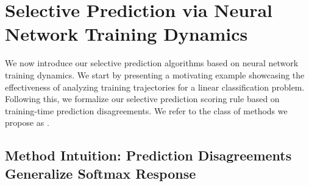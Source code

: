 

\section{Selective Prediction via Neural Network Training Dynamics}
\label{sec:method}



We now introduce our selective prediction algorithms based on neural network training dynamics. We start by presenting a motivating example showcasing the effectiveness of analyzing training trajectories for a linear classification problem. Following this, we formalize our selective prediction scoring rule based on training-time prediction disagreements. We refer to the class of methods we propose as \sptd.

\subsection{Method Intuition: Prediction Disagreements Generalize Softmax Response}
\label{sec:method_intuition}

